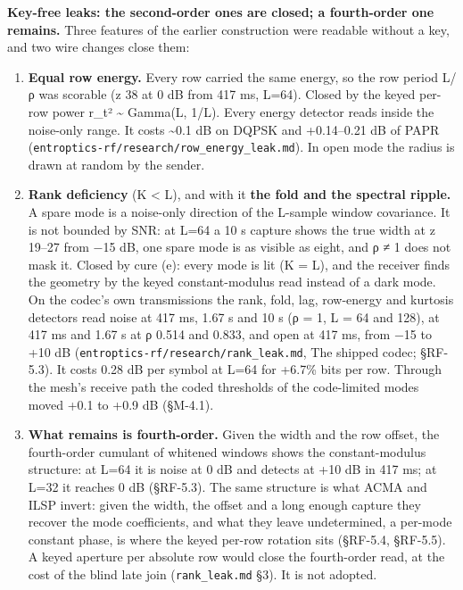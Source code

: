 \documentclass[10pt,letterpaper,twocolumn]{article}
\providecommand{\tightlist}{\setlength{\itemsep}{0pt}\setlength{\parskip}{0pt}}
\begin{document}
\textbf{Key-free leaks: the second-order ones are closed; a fourth-order one remains.} Three features of the earlier construction were readable without a key, and two wire changes close them:

\begin{enumerate}
\def\labelenumi{\arabic{enumi}.}
\tightlist
\item
  \textbf{Equal row energy.} Every row carried the same energy, so the row period L/ρ was scorable (z 38 at 0 dB from 417 ms, L=64). Closed by the keyed per-row power r\_t² \textasciitilde{} Gamma(L, 1/L). Every energy detector reads inside the noise-only range. It costs \textasciitilde0.1 dB on DQPSK and +0.14--0.21 dB of PAPR (\texttt{entroptics-{}\allowbreak{}rf/\allowbreak{}research/\allowbreak{}row\_\allowbreak{}energy\_\allowbreak{}leak.\allowbreak{}md}). In open mode the radius is drawn at random by the sender.
\item
  \textbf{Rank deficiency} (K \textless{} L), and with it \textbf{the fold and the spectral ripple.} A spare mode is a noise-only direction of the L-sample window covariance. It is not bounded by SNR: at L=64 a 10 s capture shows the true width at z 19--27 from −15 dB, one spare mode is as visible as eight, and ρ ≠ 1 does not mask it. Closed by cure (e): every mode is lit (K = L), and the receiver finds the geometry by the keyed constant-modulus read instead of a dark mode. On the codec's own transmissions the rank, fold, lag, row-energy and kurtosis detectors read noise at 417 ms, 1.67 s and 10 s (ρ = 1, L = 64 and 128), at 417 ms and 1.67 s at ρ 0.514 and 0.833, and open at 417 ms, from −15 to +10 dB (\texttt{entroptics-{}\allowbreak{}rf/\allowbreak{}research/\allowbreak{}rank\_\allowbreak{}leak.\allowbreak{}md}, The shipped codec; §RF-5.3). It costs 0.28 dB per symbol at L=64 for +6.7\% bits per row. Through the mesh's receive path the coded thresholds of the code-limited modes moved +0.1 to +0.9 dB (§M-4.1).
\item
  \textbf{What remains is fourth-order.} Given the width and the row offset, the fourth-order cumulant of whitened windows shows the constant-modulus structure: at L=64 it is noise at 0 dB and detects at +10 dB in 417 ms; at L=32 it reaches 0 dB (§RF-5.3). The same structure is what ACMA and ILSP invert: given the width, the offset and a long enough capture they recover the mode coefficients, and what they leave undetermined, a per-mode constant phase, is where the keyed per-row rotation sits (§RF-5.4, §RF-5.5). A keyed aperture per absolute row would close the fourth-order read, at the cost of the blind late join (\texttt{rank\_\allowbreak{}leak.\allowbreak{}md} §3). It is not adopted.
\end{enumerate}
\end{document}
